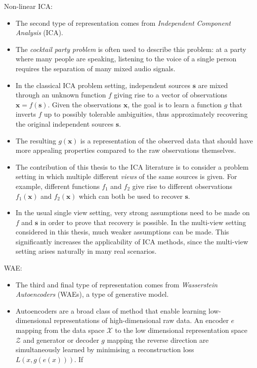 Non-linear ICA:

\begin{itemize}
\item The second type of representation comes from \emph{Independent Component Analysis} (ICA). 
\item The \emph{cocktail party problem} is often used to describe this problem: at a party where many people are speaking, listening to the voice of a single person requires the separation of many mixed audio signals.
\item In the classical ICA problem setting, independent sources $\mathbf{s}$ are mixed through an unknown function $f$ giving rise to a vector of observations $\mathbf{x} = f(\mathbf{s})$. Given the observations $\mathbf{x}$, the goal is to learn a function $g$ that inverts $f$ up to possibly tolerable ambiguities, thus approximately recovering the original independent sources $\mathbf{s}$. 
\item The resulting $g(\mathbf{x})$ is a representation of the observed data that should have more appealing properties compared to the raw observations themselves.
\item The contribution of this thesis to the ICA literature is to consider a problem setting in which multiple different \emph{views} of the same sources is given. For example, different functions $f_1$ and $f_2$ give rise to different observations $f_1(\mathbf{x})$ and $f_2(\mathbf{x})$ which can both be used to recover $\mathbf{s}$.
\item In the usual single view setting, very strong assumptions need to be made on $f$ and $\mathbf{s}$ in order to prove that recovery is possible. In the multi-view setting considered in this thesis, much weaker assumptions can be made. This significantly increases the applicability of ICA methods, since the multi-view setting arises naturally in many real scenarios.
\end{itemize}

WAE:

\begin{itemize}
\item The third and final type of representation comes from \emph{Wasserstein Autoencoders} (WAEs), a type of generative model. 
\item Autoencoders are a broad class of method that enable learning low-dimensional representations of high-dimensional raw data. An encoder $e$ mapping from the data space $\mathcal{X}$ to the low dimensional representation space $\mathcal{Z}$ and generator or decoder $g$ mapping the reverse direction are simultaneously learned by minimising a reconstruction loss $L\left(x, g(e(x))\right)$. If 
\end{itemize}


